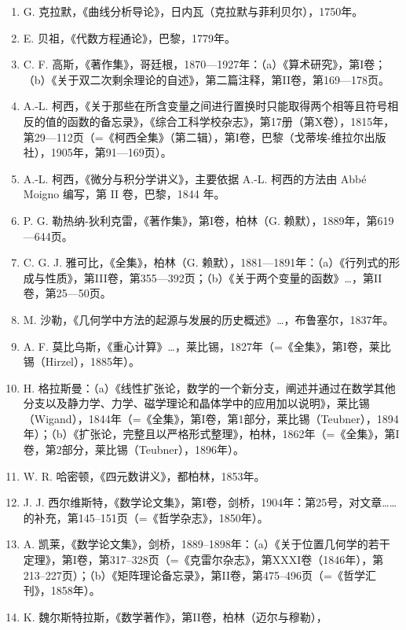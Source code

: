 \begin{enumerate}
\def\labelenumi{\arabic{enumi}.}
\setcounter{enumi}{9}
\item
  G. 克拉默，《曲线分析导论》，日内瓦（克拉默与菲利贝尔），1750年。
\item
  E. 贝祖，《代数方程通论》，巴黎，1779年。
\item
  C. F. 高斯，《著作集》，哥廷根，1870—1927年：（a）《算术研究》，第I卷；（b）《关于双二次剩余理论的自述》，第二篇注释，第II卷，第169—178页。
\item
  A.-L. 柯西，《关于那些在所含变量之间进行置换时只能取得两个相等且符号相反的值的函数的备忘录》，《综合工科学校杂志》，第17册（第X卷），1815年，第29—112页（=《柯西全集》（第二辑），第I卷，巴黎（戈蒂埃-维拉尔出版社），1905年，第91—169页）。
\item
  A.-L. 柯西，《微分与积分学讲义》，主要依据 A.-L. 柯西的方法由 Abbé Moigno 编写，第 II 卷，巴黎，1844 年。
\item
  P. G. 勒热纳-狄利克雷，《著作集》，第I卷，柏林（G. 赖默），1889年，第619—644页。
\item
  C. G. J. 雅可比，《全集》，柏林（G. 赖默），1881—1891年：（a）《行列式的形成与性质》，第III卷，第355—392页；（b）《关于两个变量的函数》\ldots，第II卷，第25—50页。
\item
  M. 沙勒，《几何学中方法的起源与发展的历史概述》\ldots，布鲁塞尔，1837年。
\item
  A. F. 莫比乌斯，《重心计算》\ldots，莱比锡，1827年（=《全集》，第I卷，莱比锡（Hirzel），1885年）。
\item
  H. 格拉斯曼：（a）《线性扩张论，数学的一个新分支，阐述并通过在数学其他分支以及静力学、力学、磁学理论和晶体学中的应用加以说明》，莱比锡（Wigand），1844年（=《全集》，第I卷，第1部分，莱比锡（Teubner），1894年）；（b）《扩张论，完整且以严格形式整理》，柏林，1862年（=《全集》，第I卷，第2部分，莱比锡（Teubner），1896年）。
\item
  W. R. 哈密顿，《四元数讲义》，都柏林，1853年。
\item
  J. J. 西尔维斯特，《数学论文集》，第I卷，剑桥，1904年：第25号，对文章……的补充，第145--151页（=《哲学杂志》，1850年）。
\item
  A. 凯莱，《数学论文集》，剑桥，1889--1898年：（a）《关于位置几何学的若干定理》，第I卷，第317--328页（=《克雷尔杂志》，第XXXI卷（1846年），第213--227页）；（b）《矩阵理论备忘录》，第II卷，第475--496页（=《哲学汇刊》，1858年）。
\item
  K. 魏尔斯特拉斯，《数学著作》，第II卷，柏林（迈尔与穆勒），
\end{enumerate}

